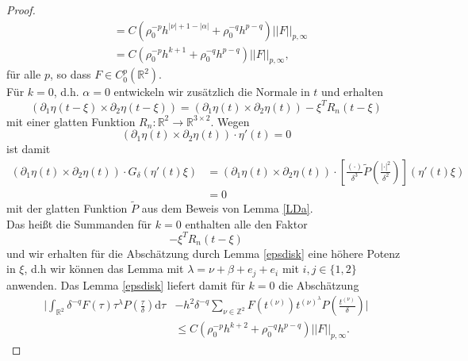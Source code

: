 \documentclass[12pt,a4paper]{scrartcl}
\newcommand{\dd}{\mathrm{d}}
\numberwithin{equation}{section}
\newcommand{\R}{\mathbb{R}} %
\newcommand{\Z}{\mathbb{Z}} %
\begin{document}
\begin{proof}
\begin{align*}
&= C( \rho_0^{-p}h^{|\nu|+1-|\alpha|}+\rho_0^{-q}h^{p-q})||F||_{p,\infty} \\
&= C( \rho_0^{-p}h^{k+1}+\rho_0^{-q}h^{p-q})||F||_{p,\infty},
\end{align*}
für alle $p$, so dass $F \in C_0^p(\R^2)$.
 \\
Für $k=0$, d.h. $\alpha=0$ entwickeln wir zusätzlich die Normale in $t$ und erhalten
\[
(\partial_1 \eta (t-\xi) \times \partial_2 \eta(t-\xi)) = (\partial_1 \eta (t) \times \partial_2 \eta(t)) - \xi^{T} R_n (t-\xi)
\]
mit einer glatten Funktion $R_n: \R^2 \to \R^{3 \times 2}$. Wegen 
\[
(\partial_1 \eta (t) \times \partial_2 \eta(t)) \cdot \eta'(t) = 0
\] ist damit 
\begin{align*}
(\partial_1 \eta (t) \times \partial_2 \eta(t)) \cdot G_{\delta}(\eta'(t)\xi) &=  (\partial_1 \eta (t) \times \partial_2 \eta(t)) \cdot \left[\frac{(\cdot)}{\delta^3}\tilde P \left(\frac{|\cdot|^2}{\delta^2}\right)\right](\eta'(t)\xi) \\
&= 0
\end{align*}
mit der glatten Funktion $\tilde P$ aus dem Beweis von Lemma \ref{LDa}.\\
Das heißt die Summanden für $k=0$ enthalten alle den Faktor 
\[
- \xi^{T} R_n (t-\xi)
\] und wir erhalten für die Abschätzung durch Lemma \ref{epsdisk} eine höhere Potenz in $\xi$, d.h wir können das Lemma mit $\lambda=\nu + \beta + e_j +e_i$ mit $i,j \in\{1,2\}$ anwenden. Das Lemma \ref{epsdisk} liefert damit für $k=0$ die Abschätzung
\begin{align*}
\bigg|\int_{\R^2} \delta^{-q}F(\tau)\tau^\lambda P\left(\frac{\tau}{\delta}\right) \dd \tau &- h^2 \delta^{-q} \sum_{\nu \in \Z^2}F(t^{(\nu)})t^{(\nu)^\lambda} P\left(\frac{t^{(\nu)}}{\delta}\right)\bigg| \\
&\leq C( \rho_0^{-p}h^{k+2}+\rho_0^{-q}h^{p-q})||F||_{p,\infty}.
\end{align*}


\end{proof}
\end{document}
